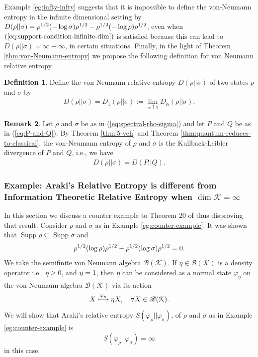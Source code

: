 \documentclass[12pt,a4paper,oneside]{article}
\numberwithin{equation}{section}
\theoremstyle{definition}  %
\newtheorem{defn}{Definition}[section]
\newtheorem{rmk}[defn]{Remark}
\theoremstyle{plain}  %
\theoremstyle{remark} %
\newcommand{\B}[1]{\mathscr{B}({#1})}
\newcommand{\CK}{\mathcal{K}}
\let\tr\relax
\DeclareMathOperator{\tr}{Tr}
\DeclareMathOperator{\supp}{Supp}
\begin{document}
Example \ref{eg:infty-infty} suggests that it is impossible to define the von-Neumann entropy in the infinite dimensional setting  by   $D(\rho||\sigma) = \tr \rho^{1/2}(-\log\sigma)\rho^{1/2}-\tr\rho^{1/2}(-\log\rho)\rho^{1/2}$, even when $(\ref{eq:support-condition-infinite-dim})$ is satisfied because this can lead to $D(\rho||\sigma)= \infty-\infty$,  in certain situations.  
Finally, in the light of Theorem \ref{thm:von-Neumann-entropy} we propose the following definition for von Neumann relative entropy.
 \begin{defn}\label{defn:vn-entropy}
 Define the von-Neumann relative entropy $D(\rho||\sigma)$ of two states $\rho$ and $\sigma$ by
 \begin{align}
     D(\rho||\sigma) = D_1(\rho||\sigma):= \lim_{\alpha \uparrow 1}D_{\alpha}(\rho||\sigma).
 \end{align}
 \end{defn}
 \begin{rmk}
 \label{rmk:5-veh-quantum} Let $\rho$ and $\sigma$ be as in (\ref{eq:spectral-rho-sigma})  and let $P$ and $Q$ be as in (\ref{eq:P-and-Q}).   By Theorem \ref{thm:5-veh} and Theorem \ref{thm:quantum-reduces-to-classical}, the von-Neumann entropy of $\rho$ and $\sigma$ is  the Kullback-Leibler divergence of $P$ and $Q$, i.e., we have \begin{align}\label{eq:5-veh-quantum} 
     D(\rho||\sigma) = D(P||Q).
 \end{align}
 \end{rmk} 
\subsubsection{Example: Araki's Relative Entropy is different from Information Theoretic Relative Entropy when \texorpdfstring{\ensuremath{\dim \CK  =\infty}}{}}\label{sec:counter-eg}
In this section we discuss a counter example to  Theorem 20 of \cite{luczak2019relative} thus disproving that result.
Consider $\rho$ and $\sigma$ as in  Example \ref{eg:counter-example}. It was shown that $\supp \rho \subseteq \supp \sigma$ and \[\tr \rho^{1/2}(\log \rho) \rho^{1/2}-\tr\rho^{1/2}(\log \sigma)\rho^{1/2}=0.\] We take the semifinite von Neumann algebra  $\B{\CK }$. If $\eta\in \B{\CK }$ is a density operator i.e., $\eta\geq 0$, and $\tr \eta =1$, then $\eta$ can be considered as a normal state $\varphi_{\eta}$ on the von Neumann algebra $\B{\CK }$ via its action \[X\overset{\varphi_{\eta}}{\longmapsto} \tr \eta X, \quad \forall X\in \B{\CK }.\] We will show that Araki's relative entropy $S(\varphi_{\rho}||\varphi_\sigma)$, of $\rho$ and $\sigma$ as in Example \ref{eg:counter-example} is\[ S(\varphi_{\rho}||\varphi_\sigma) = \infty\] 
in this case. 
\end{document}
